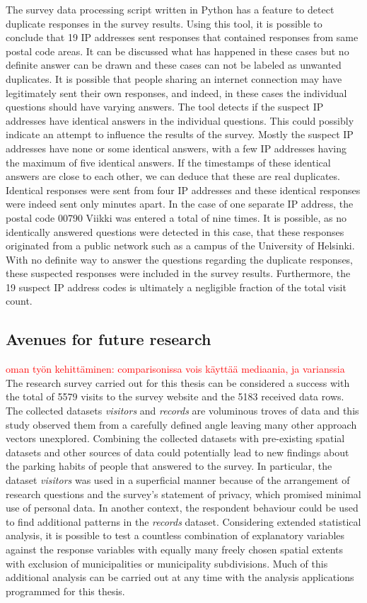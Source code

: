 The survey data processing script written in Python has a feature to detect duplicate responses in the survey results. Using this tool, it is possible to conclude that 19 IP addresses sent responses that contained responses from same postal code areas. It can be discussed what has happened in these cases but no definite answer can be drawn and these cases can not be labeled as unwanted duplicates. It is possible that people sharing an internet connection may have legitimately sent their own responses, and indeed, in these cases the individual questions should have varying answers. The tool detects if the suspect IP addresses have identical answers in the individual questions. This could possibly indicate an attempt to influence the results of the survey. Mostly the suspect IP addresses have none or some identical answers, with a few IP addresses having the maximum of five identical answers. If the timestamps of these identical answers are close to each other, we can deduce that these are real duplicates. Identical responses were sent from four IP addresses and these identical responses were indeed sent only minutes apart. In the case of one separate IP address, the postal code 00790 Viikki was entered a total of nine times. It is possible, as no identically answered questions were detected in this case, that these responses originated from a public network such as a campus of the University of Helsinki. With no definite way to answer the questions regarding the duplicate responses, these suspected responses were included in the survey results. Furthermore, the 19 suspect IP address codes is ultimately a negligible fraction of the total visit count.

\newpage
\subsection{Avenues for future research}
\justify

\textcolor{red}{oman työn kehittäminen: comparisonissa vois käyttää mediaania, ja varianssia}
The research survey carried out for this thesis can be considered a success with the total of 5579 visits to the survey website and the 5183 received data rows. The collected datasets \textit{visitors} and \textit{records} are voluminous troves of data and this study observed them from a carefully defined angle leaving many other approach vectors unexplored. Combining the collected datasets with pre-existing spatial datasets and other sources of data could potentially lead to new findings about the parking habits of people that answered to the survey. In particular, the dataset \textit{visitors} was used in a superficial manner because of the arrangement of research questions and the survey's statement of privacy, which promised minimal use of personal data. In another context, the respondent behaviour could be used to find additional patterns in the \textit{records} dataset. Considering extended statistical analysis, it is possible to test a countless combination of explanatory variables against the response variables with equally many freely chosen spatial extents with exclusion of municipalities or municipality subdivisions. Much of this additional analysis can be carried out at any time with the analysis applications programmed for this thesis.

